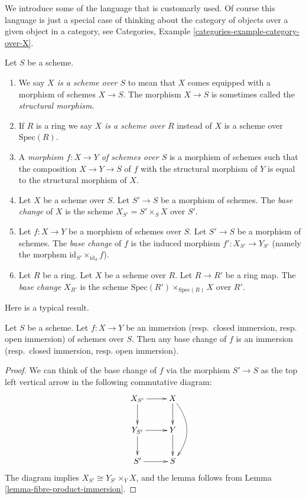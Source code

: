 \medskip\noindent
We introduce some of the language that is customarly used.
Of course this language is just a special case of thinking
about the category of objects over a given object in a category,
see Categories, Example \ref{categories-example-category-over-X}.

\begin{definition}
\label{definition-base-change}
Let $S$ be a scheme.
\begin{enumerate}
\item We say {\it $X$ is a scheme over $S$} to mean that $X$
comes equipped with a morphism of schemes $X \to S$.
The morphism $X \to S$ is sometimes called the {\it structural
morphism}.
\item If $R$ is a ring we say
{\it $X$ is a scheme over $R$} instead of
$X$ is a scheme over $\text{Spec}(R)$.
\item A {\it morphism $f : X \to Y$ of schemes over $S$}
is a morphism of schemes such that the composition
$X \to Y \to S$ of $f$ with the structural morphism of $Y$ is
equal to the structural morphism of $X$.
\item Let $X$ be a scheme over $S$. Let $S' \to S$ be a
morphism of schemes. The {\it base change} of $X$
is the scheme $X_{S'} = S' \times_S X$ over $S'$.
\item Let $f : X \to Y$ be a morphism of schemes over $S$. Let $S' \to S$
be a morphism of schemes. The {\it base change} of $f$ is
the induced morphism $f' : X_{S'} \to Y_{S'}$ (namely the
morphsm $\text{id}_{S'} \times_{\text{id}_S} f$).
\item Let $R$ be a ring. Let $X$ be a scheme over $R$.
Let $R \to R'$ be a ring map. The {\it base change} $X_{R'}$
is the scheme $\text{Spec}(R') \times_{\text{Spec}(R)} X$
over $R'$.
\end{enumerate}
\end{definition}

\noindent
Here is a typical result.

\begin{lemma}
\label{lemma-base-change-immersion}
Let $S$ be a scheme. Let $f : X \to Y$ be an
immersion (resp.\ closed immersion, resp. open immersion)
of schemes over $S$. Then any base change of $f$ is an
immersion (resp.\ closed immersion, resp. open immersion).
\end{lemma}

\begin{proof}
We can think of the base change of $f$ via the morphism
$S' \to S$ as the top left vertical arrow in the following
commutative diagram:
$$
\xymatrix{
X_{S'} \ar[r] \ar[d] & X \ar[d] \ar@/^4ex/[dd] \\
Y_{S'} \ar[r] \ar[d] & Y \ar[d] \\
S' \ar[r] & S
}
$$
The diagram implies $X_{S'} \cong Y_{S'} \times_Y X$,
and the lemma follows from Lemma \ref{lemma-fibre-product-immersion}.
\end{proof}

